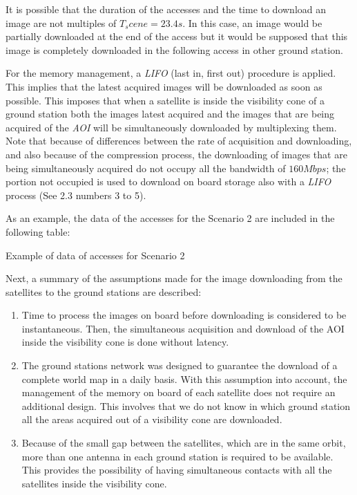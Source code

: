 It is possible that the duration of the accesses and the time to download an image are not multiples of $T_scene=23.4s$. In this case, an image would be partially downloaded at the end of the access but it would be supposed that this image is completely downloaded in the following access in other ground station. 

For the memory management, a \emph{LIFO} (last in, first out) procedure is
applied. This implies that the latest acquired images will be downloaded as soon
as possible. This imposes that when a satellite is inside the visibility cone of
a ground station both the images latest acquired and the images that are being
acquired of the \emph{AOI} will be simultaneously downloaded by multiplexing
them. Note that because of differences between the rate of acquisition and
downloading, and also because of the compression process, the downloading of
images that are being simultaneously acquired do not occupy all the bandwidth of
$160Mbps$; the portion not occupied is used to download on board storage also
with a \emph{LIFO} process (See 2.3 numbers 3 to 5).


As an example, the data of the accesses for the Scenario 2 are included in the
following table:


\begin{table}[hp]
  \centering
  {\small
  
  }
  \caption{Example of data of accesses for Scenario 2}
  \label{table:sss-accesses-scenario2}
\end{table}


Next, a summary of the assumptions made for the image downloading from the
satellites to the ground stations are described:
\begin{enumerate}
\item Time to process the images on board before downloading is considered to be instantaneous. Then, the simultaneous acquisition and download of the AOI inside the visibility cone is done without latency.
\item The ground stations network was designed to guarantee the download of a complete world map in a daily basis. With this assumption into account, the management of the memory on board of each satellite does not require an additional design. This involves that we do not know in which ground station all the areas acquired out of a visibility cone are downloaded. 
\item Because of the small gap between the satellites, which are in the same orbit, more than one antenna in each ground station is required to be available. This provides the possibility of having simultaneous contacts with all the satellites inside the visibility cone.
\end{enumerate}

